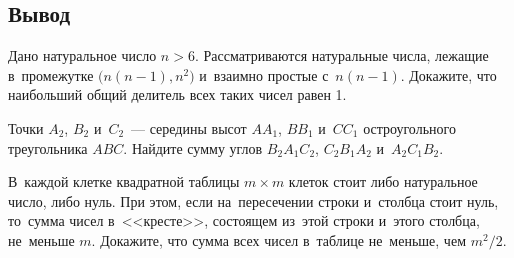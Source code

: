 




\subsection*{Вывод}

\begin{problems}

\item
Дано натуральное число $n > 6$.
Рассматриваются натуральные числа, лежащие в~промежутке
$\bigl( n (n - 1), n^2 \bigr)$ и~взаимно простые с~$n (n - 1)$.
Докажите, что наибольший общий делитель всех таких чисел равен 1.

\item
Точки $A_2$, $B_2$ и~$C_2$~--- середины высот $A A_1$, $B B_1$ и~$C C_1$
остроугольного треугольника $ABC$.
Найдите сумму углов $B_2 A_1 C_2$, $C_2 B_1 A_2$ и~$A_2 C_1 B_2$.

\item
В~каждой клетке квадратной таблицы $m \times m$ клеток стоит либо натуральное
число, либо нуль.
При этом, если на~пересечении строки и~столбца стоит нуль, то~сумма чисел
в~<<кресте>>, состоящем из~этой строки и~этого столбца, не~меньше $m$.
Докажите, что сумма всех чисел в~таблице не~меньше, чем $m^2 / 2$.

\end{problems}

